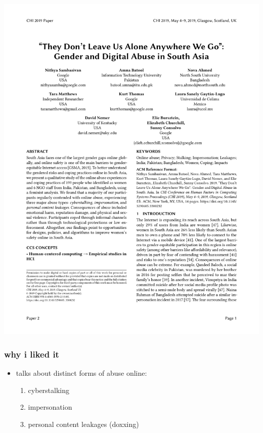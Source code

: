 \documentclass[aspectratio=169,10pt]{beamer} %
\begin{document}
\begin{frame}[t] %
\includegraphics[width=\textwidth]{pdfs/they_dont_leave_us_alone.pdf}
\end{frame}

\begin{frame}\frametitle{why i liked it}
    \begin{itemize}
      \item talks about distinct forms of abuse online:
      \begin{enumerate}
        \item cyberstalking
        \item impersonation
        \item personal content leakages (doxxing)
      \end{enumerate}
    \end{itemize}
\end{frame}
\end{document}
